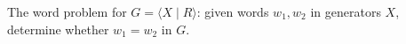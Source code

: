 The word problem for $G = \langle X \mid R \rangle$: given words $w_1, w_2$ in generators $X$, determine whether $w_1 = w_2$ in $G$.
